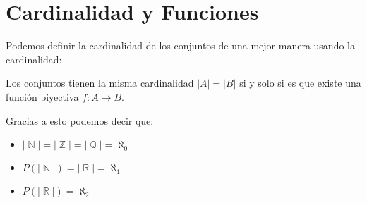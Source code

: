 \documentclass[12pt]{report}                                    %
\DeclareMathOperator \Naturals {\mathbb{N}}                     %
\DeclareMathOperator \Integers {\mathbb{Z}}                     %
\DeclareMathOperator \Racionals{\mathbb{Q}}                     %
\DeclareMathOperator \Reals {\mathbb{R}}                        %
\begin{document}
    \section{Cardinalidad y Funciones}

        Podemos definir la cardinalidad de los conjuntos de una mejor manera
        usando la cardinalidad:

        Los conjuntos tienen la misma cardinalidad $|A| = |B|$ si y solo si es que existe
        una función biyectiva $f : A \to B$.


        Gracias a esto podemos decir que:

        \begin{itemize} 
            \item $|\Naturals| = |\Integers| = |\Racionals| = \aleph_0$

            \item $P(|\Naturals|) = |\Reals| = \aleph_1$

            \item $P(|\Reals|) = \aleph_2$

        \end{itemize} 
\end{document}
